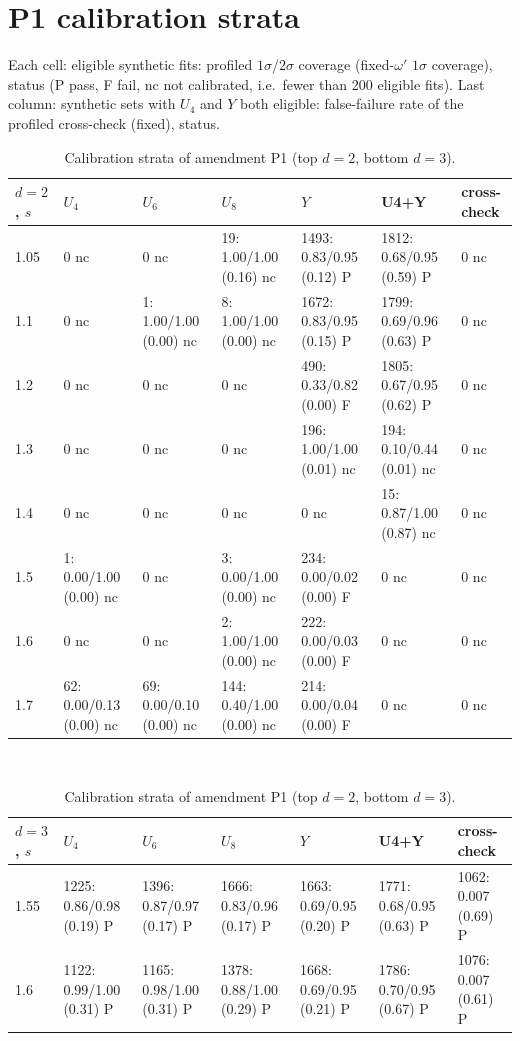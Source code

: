 \section{P1 calibration strata}\label{mc:app:calib}
Each cell: eligible synthetic fits: profiled $1\sigma$/$2\sigma$ coverage (fixed-$\omega'$ $1\sigma$ coverage), status (P pass, F fail, nc not
calibrated, i.e.\ fewer than 200 eligible fits). Last column: synthetic sets with $U_4$ and $Y$ both eligible: false-failure rate of the profiled
cross-check (fixed), status.
\begin{table}\centering\footnotesize\setlength{\tabcolsep}{4pt}
\caption{Calibration strata of amendment P1 (top $d=2$, bottom $d=3$).}\label{mc:tab:calib}
\begin{tabular}{@{}lllllll@{}}\toprule
$d=2$, $s$ & $U_4$ & $U_6$ & $U_8$ & $Y$ & U4+Y & cross-check \\\midrule
1.05 & 0 nc & 0 nc & 19: 1.00/1.00 (0.16) nc & 1493: 0.83/0.95 (0.12) P & 1812: 0.68/0.95 (0.59) P & 0 nc \\
1.1 & 0 nc & 1: 1.00/1.00 (0.00) nc & 8: 1.00/1.00 (0.00) nc & 1672: 0.83/0.95 (0.15) P & 1799: 0.69/0.96 (0.63) P & 0 nc \\
1.2 & 0 nc & 0 nc & 0 nc & 490: 0.33/0.82 (0.00) F & 1805: 0.67/0.95 (0.62) P & 0 nc \\
1.3 & 0 nc & 0 nc & 0 nc & 196: 1.00/1.00 (0.01) nc & 194: 0.10/0.44 (0.01) nc & 0 nc \\
1.4 & 0 nc & 0 nc & 0 nc & 0 nc & 15: 0.87/1.00 (0.87) nc & 0 nc \\
1.5 & 1: 0.00/1.00 (0.00) nc & 0 nc & 3: 0.00/1.00 (0.00) nc & 234: 0.00/0.02 (0.00) F & 0 nc & 0 nc \\
1.6 & 0 nc & 0 nc & 2: 1.00/1.00 (0.00) nc & 222: 0.00/0.03 (0.00) F & 0 nc & 0 nc \\
1.7 & 62: 0.00/0.13 (0.00) nc & 69: 0.00/0.10 (0.00) nc & 144: 0.40/1.00 (0.00) nc & 214: 0.00/0.04 (0.00) F & 0 nc & 0 nc \\
\bottomrule\end{tabular}\\[12pt]
\begin{tabular}{@{}lllllll@{}}\toprule
$d=3$, $s$ & $U_4$ & $U_6$ & $U_8$ & $Y$ & U4+Y & cross-check \\\midrule
1.55 & 1225: 0.86/0.98 (0.19) P & 1396: 0.87/0.97 (0.17) P & 1666: 0.83/0.96 (0.17) P & 1663: 0.69/0.95 (0.20) P & 1771: 0.68/0.95 (0.63) P & 1062: 0.007 (0.69) P \\
1.6 & 1122: 0.99/1.00 (0.31) P & 1165: 0.98/1.00 (0.31) P & 1378: 0.88/1.00 (0.29) P & 1668: 0.69/0.95 (0.21) P & 1786: 0.70/0.95 (0.67) P & 1076: 0.007 (0.61) P \\

\end{tabular}
\end{table}
